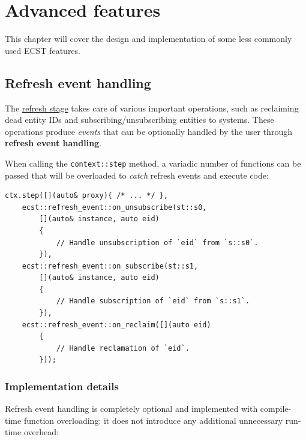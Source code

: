 \documentclass[twoside, 12pt, a4paper, openany]{book}
\begin{document}
\hypertarget{chap_advfeats}{\chapter{Advanced
features}\label{chap_advfeats}}

This chapter will cover the design and implementation of some less
commonly used ECST features.

\hypertarget{advf_refresh_event_handling}{\section{Refresh event
handling}\label{advf_refresh_event_handling}}

The \protect\hyperlink{flow_refresh}{refresh stage} takes care of
various important operations, such as reclaiming dead entity IDs and
subscribing/unsubscribing entities to systems. These operations produce
\emph{events} that can be optionally handled by the user through
\textbf{refresh event handling}.

When calling the
\texttt{context::step}
method, a variadic number of functions can be passed that will be
overloaded to \emph{catch} refresh events and execute code:

\begin{verbatim}
ctx.step([](auto& proxy){ /* ... */ },
    ecst::refresh_event::on_unsubscribe(st::s0,
        [](auto& instance, auto eid)
        {
            // Handle unsubscription of `eid` from `s::s0`.
        }),
    ecst::refresh_event::on_subscribe(st::s1,
        [](auto& instance, auto eid)
        {
            // Handle subscription of `eid` from `s::s1`.
        }),
    ecst::refresh_event::on_reclaim([](auto eid)
        {
            // Handle reclamation of `eid`.
        }));
\end{verbatim}

\subsection{Implementation details}\label{implementation-details-1}

Refresh event handling is completely optional and implemented with
compile-time function overloading: it does not introduce any additional
unnecessary run-time overhead:
\end{document}
